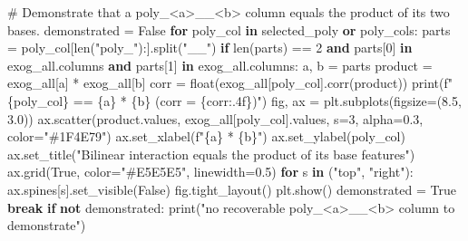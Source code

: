 \documentclass[
  english,
  letterpaper,
]{scrbook}
\newenvironment{Shaded}{\begin{snugshade}}{\end{snugshade}}
\newcommand{\BuiltInTok}[1]{\textcolor[rgb]{0.00,0.23,0.31}{#1}}
\newcommand{\CommentTok}[1]{\textcolor[rgb]{0.37,0.37,0.37}{#1}}
\newcommand{\ControlFlowTok}[1]{\textcolor[rgb]{0.00,0.23,0.31}{\textbf{#1}}}
\newcommand{\DecValTok}[1]{\textcolor[rgb]{0.68,0.00,0.00}{#1}}
\newcommand{\FloatTok}[1]{\textcolor[rgb]{0.68,0.00,0.00}{#1}}
\newcommand{\KeywordTok}[1]{\textcolor[rgb]{0.00,0.23,0.31}{\textbf{#1}}}
\newcommand{\NormalTok}[1]{\textcolor[rgb]{0.00,0.23,0.31}{#1}}
\newcommand{\OperatorTok}[1]{\textcolor[rgb]{0.37,0.37,0.37}{#1}}
\newcommand{\SpecialCharTok}[1]{\textcolor[rgb]{0.37,0.37,0.37}{#1}}
\newcommand{\SpecialStringTok}[1]{\textcolor[rgb]{0.13,0.47,0.30}{#1}}
\newcommand{\StringTok}[1]{\textcolor[rgb]{0.13,0.47,0.30}{#1}}
\newcommand{\VariableTok}[1]{\textcolor[rgb]{0.07,0.07,0.07}{#1}}
\begin{document}
\begin{Shaded}
\begin{Highlighting}[]
\CommentTok{\# Demonstrate that a poly\_\textless{}a\textgreater{}\_\_\textless{}b\textgreater{} column equals the product of its two bases.}
\NormalTok{demonstrated }\OperatorTok{=} \VariableTok{False}
\ControlFlowTok{for}\NormalTok{ poly\_col }\KeywordTok{in}\NormalTok{ selected\_poly }\KeywordTok{or}\NormalTok{ poly\_cols:}
\NormalTok{    parts }\OperatorTok{=}\NormalTok{ poly\_col[}\BuiltInTok{len}\NormalTok{(}\StringTok{"poly\_"}\NormalTok{):].split(}\StringTok{"\_\_"}\NormalTok{)}
    \ControlFlowTok{if} \BuiltInTok{len}\NormalTok{(parts) }\OperatorTok{==} \DecValTok{2} \KeywordTok{and}\NormalTok{ parts[}\DecValTok{0}\NormalTok{] }\KeywordTok{in}\NormalTok{ exog\_all.columns }\KeywordTok{and}\NormalTok{ parts[}\DecValTok{1}\NormalTok{] }\KeywordTok{in}\NormalTok{ exog\_all.columns:}
\NormalTok{        a, b }\OperatorTok{=}\NormalTok{ parts}
\NormalTok{        product }\OperatorTok{=}\NormalTok{ exog\_all[a] }\OperatorTok{*}\NormalTok{ exog\_all[b]}
\NormalTok{        corr }\OperatorTok{=} \BuiltInTok{float}\NormalTok{(exog\_all[poly\_col].corr(product))}
        \BuiltInTok{print}\NormalTok{(}\SpecialStringTok{f"}\SpecialCharTok{\{}\NormalTok{poly\_col}\SpecialCharTok{\}}\SpecialStringTok{ == }\SpecialCharTok{\{}\NormalTok{a}\SpecialCharTok{\}}\SpecialStringTok{ * }\SpecialCharTok{\{}\NormalTok{b}\SpecialCharTok{\}}\SpecialStringTok{  (corr = }\SpecialCharTok{\{}\NormalTok{corr}\SpecialCharTok{:.4f\}}\SpecialStringTok{)"}\NormalTok{)}
\NormalTok{        fig, ax }\OperatorTok{=}\NormalTok{ plt.subplots(figsize}\OperatorTok{=}\NormalTok{(}\FloatTok{8.5}\NormalTok{, }\FloatTok{3.0}\NormalTok{))}
\NormalTok{        ax.scatter(product.values, exog\_all[poly\_col].values, s}\OperatorTok{=}\DecValTok{3}\NormalTok{, alpha}\OperatorTok{=}\FloatTok{0.3}\NormalTok{, color}\OperatorTok{=}\StringTok{"\#1F4E79"}\NormalTok{)}
\NormalTok{        ax.set\_xlabel(}\SpecialStringTok{f"}\SpecialCharTok{\{}\NormalTok{a}\SpecialCharTok{\}}\SpecialStringTok{ * }\SpecialCharTok{\{}\NormalTok{b}\SpecialCharTok{\}}\SpecialStringTok{"}\NormalTok{)}
\NormalTok{        ax.set\_ylabel(poly\_col)}
\NormalTok{        ax.set\_title(}\StringTok{"Bilinear interaction equals the product of its base features"}\NormalTok{)}
\NormalTok{        ax.grid(}\VariableTok{True}\NormalTok{, color}\OperatorTok{=}\StringTok{"\#E5E5E5"}\NormalTok{, linewidth}\OperatorTok{=}\FloatTok{0.5}\NormalTok{)}
        \ControlFlowTok{for}\NormalTok{ s }\KeywordTok{in}\NormalTok{ (}\StringTok{"top"}\NormalTok{, }\StringTok{"right"}\NormalTok{):}
\NormalTok{            ax.spines[s].set\_visible(}\VariableTok{False}\NormalTok{)}
\NormalTok{        fig.tight\_layout()}
\NormalTok{        plt.show()}
\NormalTok{        demonstrated }\OperatorTok{=} \VariableTok{True}
        \ControlFlowTok{break}
\ControlFlowTok{if} \KeywordTok{not}\NormalTok{ demonstrated:}
    \BuiltInTok{print}\NormalTok{(}\StringTok{"no recoverable poly\_\textless{}a\textgreater{}\_\_\textless{}b\textgreater{} column to demonstrate"}\NormalTok{)}


\end{Highlighting}
\end{Shaded}
\end{document}
